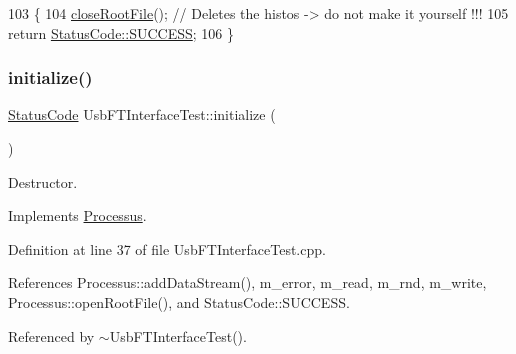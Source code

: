 \begin{DoxyCode}
103                                           \{
104   \hyperlink{classProcessus_a2f3c41e99da4c738ea3d8f7b0d20a665}{closeRootFile}(); \textcolor{comment}{// Deletes the histos -> do not make it yourself !!!}
105   \textcolor{keywordflow}{return} \hyperlink{classStatusCode_a6f565cbeadc76d14c72f047e5e85eb4badd0da38d3ba0d922efd1f4619bc37ad8}{StatusCode::SUCCESS};
106 \}
\end{DoxyCode}
\mbox{\label{classUsbFTInterfaceTest_a68831f83830305e65d830c55af16e878}} 
\subsubsection{\texorpdfstring{initialize()}{initialize()}}
{\footnotesize\ttfamily \hyperlink{classStatusCode}{Status\+Code} Usb\+F\+T\+Interface\+Test\+::initialize (\begin{DoxyParamCaption}{ }\end{DoxyParamCaption})\hspace{0.3cm}{\ttfamily [virtual]}}



Destructor. 



Implements \hyperlink{classProcessus_aee88ad7b77ae7319cf8b128e9dd2ea11}{Processus}.



Definition at line 37 of file Usb\+F\+T\+Interface\+Test.\+cpp.



References Processus\+::add\+Data\+Stream(), m\+\_\+error, m\+\_\+read, m\+\_\+rnd, m\+\_\+write, Processus\+::open\+Root\+File(), and Status\+Code\+::\+S\+U\+C\+C\+E\+SS.



Referenced by $\sim$\+Usb\+F\+T\+Interface\+Test().


